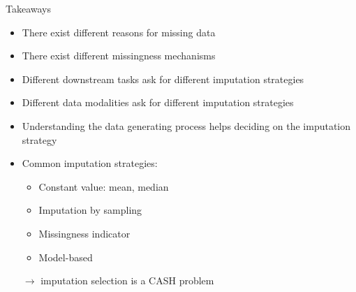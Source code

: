 \documentclass[10pt,compress,t,notes=noshow, xcolor=table]{beamer}
\begin{document}
\begin{frame}{Takeaways}
    \vfill
    \begin{itemize}
        \item There exist different reasons for missing data
        \item There exist different missingness mechanisms
        \item Different downstream tasks ask for different imputation strategies
        \item Different data modalities ask for different imputation strategies
        \item Understanding the data generating process helps deciding on the imputation strategy
        \item Common imputation strategies:
        \begin{itemize}
            \item Constant value: mean, median
            \item Imputation by sampling
            \item Missingness indicator
            \item Model-based
        \end{itemize}
        $\rightarrow$ imputation selection is a CASH problem
    \end{itemize}
    \vfill
\end{frame}

\endlecture
\end{document}
